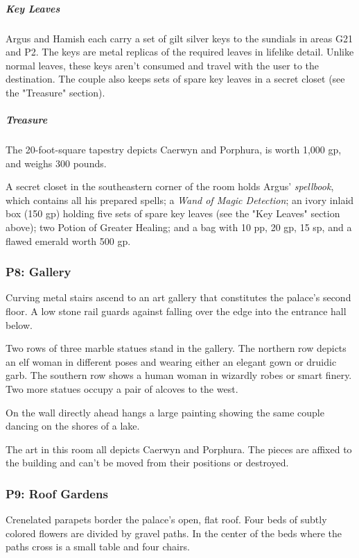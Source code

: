 \documentclass[10pt,a4paper,twoside,bg=print,twocolumn,openany,nodeprecatedcode]{dndbook}
\begin{document}
\subparagraph{Key Leaves}
Argus and Hamish each carry a set of gilt silver keys to the sundials in areas G21 and P2. The keys are metal replicas of the required leaves in lifelike detail. Unlike normal leaves, these keys aren't consumed and travel with the user to the destination. The couple also keeps sets of spare key leaves in a secret closet (see the "Treasure" section).

\subparagraph{Treasure}
The 20-foot-square tapestry depicts Caerwyn and Porphura, is worth 1,000 gp, and weighs 300 pounds.

A secret closet in the southeastern corner of the room holds Argus' \textit{spellbook}, which contains all his prepared spells; a \textit{Wand of Magic Detection}; an ivory inlaid box (150 gp) holding five sets of spare key leaves (see the "Key Leaves" section above); two Potion of Greater Healing; and a bag with 10 pp, 20 gp, 15 sp, and a flawed emerald worth 500 gp.

\subsubsection{P8: Gallery}
\begin{DndReadAloud}{}
Curving metal stairs ascend to an art gallery that constitutes the palace's second floor. A low stone rail guards against falling over the edge into the entrance hall below.

Two rows of three marble statues stand in the gallery. The northern row depicts an elf woman in different poses and wearing either an elegant gown or druidic garb. The southern row shows a human woman in wizardly robes or smart finery. Two more statues occupy a pair of alcoves to the west.

On the wall directly ahead hangs a large painting showing the same couple dancing on the shores of a lake.

\end{DndReadAloud}

The art in this room all depicts Caerwyn and Porphura. The pieces are affixed to the building and can't be moved from their positions or destroyed.

\subsubsection{P9: Roof Gardens}
\begin{DndReadAloud}{}
Crenelated parapets border the palace's open, flat roof. Four beds of subtly colored flowers are divided by gravel paths. In the center of the beds where the paths cross is a small table and four chairs.

\end{DndReadAloud}
\end{document}
